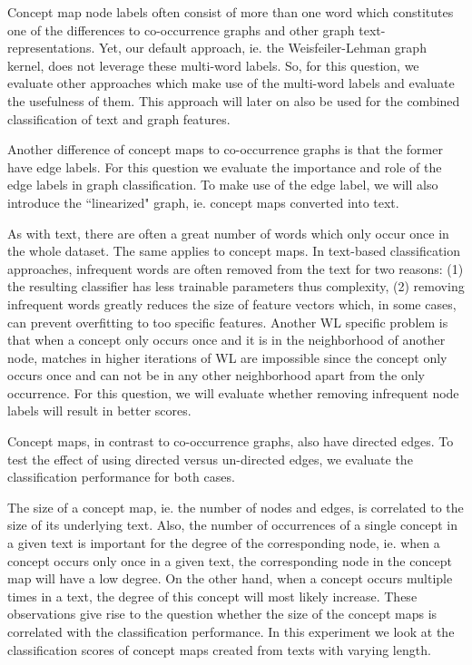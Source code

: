 Concept map node labels often consist of more than one word which constitutes one of the differences to co-occurrence graphs and other graph text-representations.
Yet, our default approach, ie. the Weisfeiler-Lehman graph kernel, does not leverage these multi-word labels.
So, for this question, we evaluate other approaches which make use of the multi-word labels and evaluate the usefulness of them.
This approach will later on also be used for the combined classification of text and graph features.

Another difference of concept maps to co-occurrence graphs is that the former have edge labels.
For this question we evaluate the importance and role of the edge labels in graph classification. To make use of the edge label, we will also introduce the ``linearized" graph, ie. concept maps converted into text.

As with text, there are often a great number of words which only occur once in the whole dataset. The same applies to concept maps.
In text-based classification approaches, infrequent words are often removed from the text for two reasons: (1) the resulting classifier has less trainable parameters thus complexity, (2) removing infrequent words greatly reduces the size of feature vectors which, in some cases, can prevent overfitting to too specific features.
Another WL specific problem is that when a concept only occurs once and it is in the neighborhood of another node, matches in higher iterations of WL are impossible since the concept only occurs once and can not be in any other neighborhood apart from the only occurrence.
For this question, we will evaluate whether removing infrequent node labels will result in better scores.

Concept maps, in contrast to co-occurrence graphs, also have directed edges.
To test the effect of using directed versus un-directed edges, we evaluate the classification performance for both cases.

The size of a concept map, ie. the number of nodes and edges, is correlated to the size of its underlying text.
Also, the number of occurrences of a single concept in a given text is important for the degree of the corresponding node, ie. when a concept occurs only once in a given text, the corresponding node in the concept map will have a low degree.
On the other hand, when a concept occurs multiple times in a text, the degree of this concept will most likely increase.
These observations give rise to the question whether the size of the concept maps is correlated with the classification performance.
In this experiment we look at the classification scores of concept maps created from texts with varying length.

